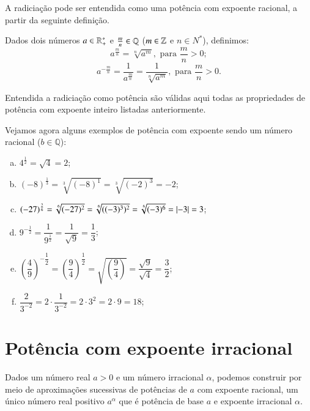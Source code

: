  A radiciação pode ser entendida como uma potência com expoente racional, a partir da seguinte definição.
 \vskip0.3cm

 \colorbox{azul}{
 \begin{minipage}{0.9\linewidth}
 \begin{center}
  Dados dois números $a \in \mathbb{R}^{*}_{+}$ e $\frac{m}{n} \in \mathbb{Q}$ ($m \in \mathbb{Z}$ e $n \in N^{*}$), definimos:
 \[a^{\frac{m}{n}}= \sqrt[n]{a^m}, \text{ para } \frac{m}{n} >0 ;\]
 \[a^{-\frac{m}{n}}= \frac{1}{a^{\frac{m}{n}}}= \frac{1}{\sqrt[n]{a^m}},  \text{ para } \frac{m}{n} >0.\]
 \end{center}
 \end{minipage}}

 \vskip0.3cm

 Entendida a radiciação como potência são válidas aqui todas as propriedades de potência com expoente inteiro listadas anteriormente.

 \begin{exem}
  Vejamos agora alguns exemplos de potência com expoente sendo um número racional ($b \in \mathbb{Q}$):
  \begin{enumerate}[a)]
   \item $4^{\frac{1}{2}}= \sqrt{4}= 2$;
   \item $(-8)^{\frac{1}{3}}= \sqrt[3]{(-8)^1}= \sqrt[3]{(-2)^{3}}= -2$;
   \item $(-27)^{\frac{2}{6}}= \sqrt[6]{(-27)^2}= \sqrt[6]{((-3)^3)^2}= \sqrt[6]{(-3)^6} = \left|-3\right| = 3$;
   \item $9^{-\frac{1}{2}}= \dfrac{1}{9^{\frac{1}{2}}}= \dfrac{1}{\sqrt{9}}= \dfrac{1}{3}$;
   \item $\left(\dfrac{4}{9}\right)^{-\dfrac{1}{2}}= \left(\dfrac{9}{4}\right)^{\dfrac{1}{2}}= \sqrt{\left(\dfrac{9}{4}\right)}=\dfrac{\sqrt{9}}{\sqrt{4}}= \dfrac{3}{2}$;
   \item $\dfrac{2}{3^{-2}}= 2 \cdot \dfrac{1}{3^{-2}}= 2 \cdot 3^{2}= 2 \cdot 9= 18$;
  \end{enumerate}

 \end{exem}

 \section{Potência com expoente irracional}

 Dados um número real $a > 0$ e um número irracional $\alpha$, podemos construir por meio de aproximações sucessivas de potências de $a$ com expoente racional, um único número real positivo $a^{\alpha}$ que é potência de base $a$ e expoente irracional $\alpha$.

